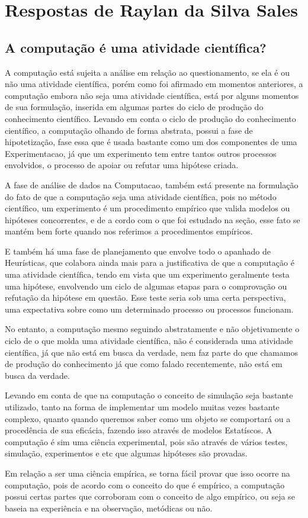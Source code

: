 \section{Respostas de Raylan da Silva Sales}

\subsection{A computação é uma atividade científica?}

A computação está sujeita a análise em relação ao questionamento, se ela é ou não uma atividade científica, porém como foi afirmado em momentos anteriores, a computação embora não seja uma atividade científica, está por alguns momentos de sua formulação, inserida em algumas partes do ciclo de produção do conhecimento científico. Levando em conta o ciclo de produção do conhecimento científico, a computação olhando de forma abstrata, possui a fase de hipotetização, fase essa que é usada bastante como um dos componentes de uma \gls{Experimentacao}, já que um experimento tem entre tantos outros processos envolvidos, o processo de apoiar ou refutar uma hipótese criada.

A fase de análise de dados na \gls{Computacao}, também está presente na formulação do fato de que a computação seja uma atividade científica, pois no método científico, um experimento é um procedimento empírico que valida modelos ou hipóteses concorrentes, e de a cordo com o que foi estudado na seção, esse fato se mantém bem forte quando nos referimos a procedimentos empíricos.

E também há uma fase de planejamento que envolve todo o apanhado de \gls{Heurísticas}, que colabora ainda mais para a justificativa de que a computação é uma atividade científica, tendo em vista que um experimento geralmente testa uma hipótese, envolvendo um ciclo de algumas etapas para o comprovação ou refutação da hipótese em questão. Esse teste seria sob uma certa perspectiva, uma expectativa sobre como um determinado processo ou processos funcionam.

No entanto, a computação mesmo seguindo abstratamente e não objetivamente o ciclo de o que molda uma atividade científica, não é considerada uma atividade científica, já que não está em busca da verdade, nem faz parte do que chamamos de produção do conhecimento já que como falado recentemente, não está em busca da verdade.


Levando em conta de que na computação o conceito de simulação seja bastante utilizado, tanto na forma de implementar um modelo muitas vezes bastante complexo, quanto quando queremos saber como um objeto se comportará ou a procedência de sua \gls{eficácia}, fazendo isso através de modelos \gls{Estatíscos}. A computação é sim uma ciência experimental, pois são através de vários testes, simulação, experimentos e etc que algumas hipóteses são provadas.

Em relação a ser uma ciência empírica, se torna fácil provar que isso ocorre na computação, pois de acordo com o conceito do que é empírico, a computação possui certas partes que corroboram com o conceito de algo empírico, ou seja se baseia na experiência e na observação, metódicas ou não.
